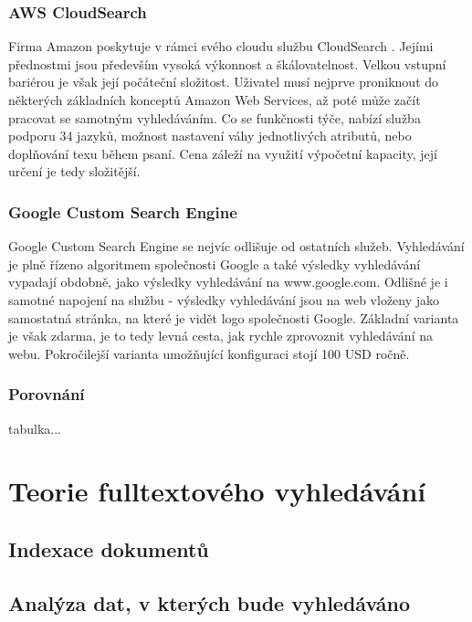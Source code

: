 \documentclass[FM,DP]{tulthesis}
\begin{document}
\subsection*{AWS CloudSearch}

Firma Amazon poskytuje v rámci svého cloudu službu CloudSearch \cite{cloud-search}.
Jejími přednostmi jsou především vysoká výkonnost a škálovatelnost. Velkou vstupní
bariérou je však její počáteční složitost. Uživatel musí nejprve proniknout do 
některých základních konceptů Amazon Web Services, až poté může začít pracovat
se samotným vyhledáváním. Co se funkčnosti týče, nabízí služba podporu 34 jazyků, 
možnost nastavení váhy jednotlivých atributů, nebo doplňování texu během psaní.
Cena záleží na využití výpočetní kapacity, její určení je tedy složitější.

\subsection*{Google Custom Search Engine}

Google Custom Search Engine \cite{gse} se nejvíc odlišuje od ostatních služeb. 
Vyhledávání je plně řízeno algoritmem společnosti Google a také výsledky vyhledávání
vypadají obdobně, jako výsledky vyhledávání na www.google.com. 
Odlišné je i samotné napojení na službu - výsledky vyhledávání jsou na web
vloženy jako samostatná stránka, na které je vidět logo společnosti Google.
Základní varianta je však zdarma, je to tedy levná cesta, jak rychle zprovoznit
vyhledávání na webu. Pokročilejší varianta umožňující konfiguraci stojí 100 USD ročně.

\subsection*{Porovnání}

tabulka...


\chapter{Teorie fulltextového vyhledávání}

\section{Indexace dokumentů}

\section{Analýza dat, v kterých bude vyhledáváno}
\end{document}
